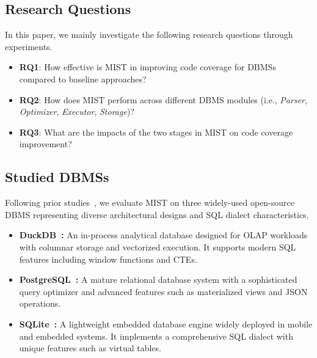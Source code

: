 \label{sec:exp_setup}
\subsection{Research Questions}

In this paper, we mainly investigate the following research questions through experiments.

\begin{itemize}

    \item \textbf{RQ1}: How effective is MIST in improving code coverage for DBMSs compared to baseline approaches?

    \item \textbf{RQ2}: How does MIST perform across different DBMS modules (i.e., \textit{Parser}, \textit{Optimizer}, \textit{Executor}, \textit{Storage})?
    
    \item \textbf{RQ3}: What are the impacts of the two stages in MIST on code coverage improvement?
       
\end{itemize}

\subsection{Studied DBMSs}

Following prior studies~\cite{zhong2025scaling,zhong2025testing}, we evaluate MIST on three widely-used open-source DBMS representing diverse architectural designs and SQL dialect characteristics.

\begin{itemize}

\item \textbf{DuckDB~\cite{raasveldt2019duckdb}:} An in-process analytical database designed for OLAP workloads with columnar storage and vectorized execution. It supports modern SQL features including window functions and CTEs.

\item \textbf{PostgreSQL~\cite{stonebraker1986design}:} A mature relational database system with a sophisticated query optimizer and advanced features such as materialized views and JSON operations.

\item \textbf{SQLite~\cite{owens2010sqlite}:} A lightweight embedded database engine widely deployed in mobile and embedded systems. It implements a comprehensive SQL dialect with unique features such as virtual tables.

\end{itemize}

